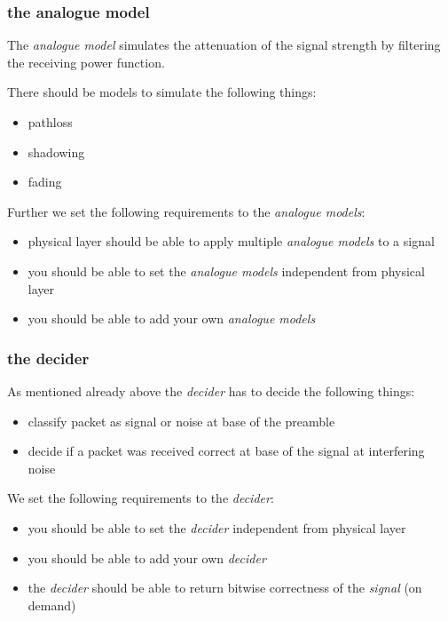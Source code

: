 \subsubsection{the analogue model}

The \textit{analogue model} simulates the attenuation of the signal strength by filtering the receiving power function.

There should be models to simulate the following things:

\begin{itemize}
 \item pathloss
 \item shadowing
 \item fading
\end{itemize}

Further we set the following requirements to the \textit{analogue models}:

\begin{itemize}
 \item physical layer should be able to apply multiple \textit{analogue models} to a signal
 \item you should be able to set the \textit{analogue models} independent from physical layer
 \item you should be able to add your own \textit{analogue models}
\end{itemize}

\subsubsection{the decider}

As mentioned already above the \textit{decider} has to decide the following things:

\begin{itemize}
\item classify packet as signal or noise at base of the preamble
\item decide if a packet was received correct at base of the signal at interfering noise
\end{itemize}

We set the following requirements to the \textit{decider}:

\begin{itemize}
 \item you should be able to set the \textit{decider} independent from physical layer
 \item you should be able to add your own \textit{decider}
 \item the \textit{decider} should be able to return bitwise correctness of the \textit{signal} (on demand)
\end{itemize}



